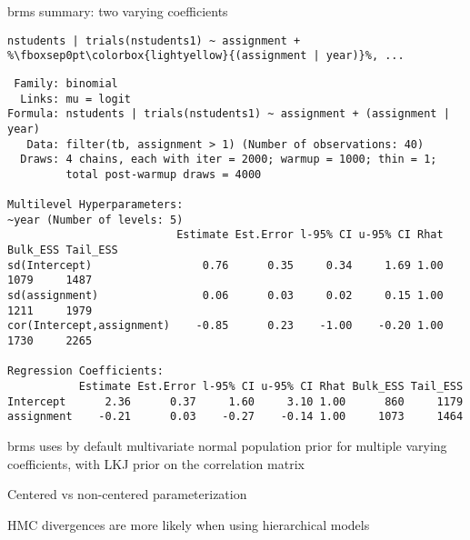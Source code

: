 \documentclass[finnish,english,t]{beamer}
\begin{document}
\begin{frame}[fragile]{brms summary: two varying coefficients}

  \vspace{-0.5\baselineskip}
\begin{verbatim}
nstudents | trials(nstudents1) ~ assignment + %\fboxsep0pt\colorbox{lightyellow}{(assignment | year)}%, ...
\end{verbatim}

\begin{verbatim}
 Family: binomial 
  Links: mu = logit 
Formula: nstudents | trials(nstudents1) ~ assignment + (assignment | year) 
   Data: filter(tb, assignment > 1) (Number of observations: 40) 
  Draws: 4 chains, each with iter = 2000; warmup = 1000; thin = 1;
         total post-warmup draws = 4000

Multilevel Hyperparameters:
~year (Number of levels: 5) 
                          Estimate Est.Error l-95% CI u-95% CI Rhat Bulk_ESS Tail_ESS
sd(Intercept)                 0.76      0.35     0.34     1.69 1.00     1079     1487
sd(assignment)                0.06      0.03     0.02     0.15 1.00     1211     1979
cor(Intercept,assignment)    -0.85      0.23    -1.00    -0.20 1.00     1730     2265

Regression Coefficients:
           Estimate Est.Error l-95% CI u-95% CI Rhat Bulk_ESS Tail_ESS
Intercept      2.36      0.37     1.60     3.10 1.00      860     1179
assignment    -0.21      0.03    -0.27    -0.14 1.00     1073     1464
\end{verbatim}

  \pause
  
  brms uses by default multivariate normal population prior for
  multiple varying coefficients, with LKJ prior on the correlation
  matrix
  
\end{frame}




\begin{frame}[fragile]{Centered vs non-centered parameterization}

\vspace{-0.5\baselineskip}
HMC divergences are more likely when using hierarchical models

\end{frame}
\end{document}
